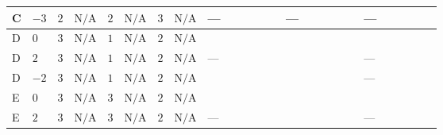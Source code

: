 \documentclass[8pt]{article}
\begin{document}
\begin{landscape}
\begin{longtable}{@{}llcccccc >{\raggedright\arraybackslash}p{0.21\linewidth} >{\raggedright\arraybackslash}p{0.21\linewidth} >{\raggedright\arraybackslash}p{0.21\linewidth}@{}}
\midrule
C & $-3$ & $2$ & $\text{N/A}$ & $2$ & $\text{N/A}$ & $3$ & $\text{N/A}$ & --- & --- & --- \\
\midrule
D & $0$ & $3$ & $\text{N/A}$ & $1$ & $\text{N/A}$ & $2$ & $\text{N/A}$ & \scriptsize\adjustbox{max width=\linewidth}{$\begin{gathered} +\frac{8}{3} {\lambda_{X_{14}}} \left({\lambda_{X_{14}}}\right)^{*}\end{gathered}$} & \scriptsize\adjustbox{max width=\linewidth}{$\begin{gathered} -\frac{33 {g_2}^2 {\lambda_{HS_1}^{(A)}}}{2}\end{gathered}$} & \scriptsize\adjustbox{max width=\linewidth}{$\begin{gathered} -\frac{3 {g_1}^2 {\lambda_{HS_1}^{(A)}}}{2}\end{gathered}$} \\
\midrule
D & $2$ & $3$ & $\text{N/A}$ & $1$ & $\text{N/A}$ & $2$ & $\text{N/A}$ & --- & \scriptsize\adjustbox{max width=\linewidth}{$\begin{gathered} -\frac{33 {g_2}^2 {\lambda_{HS_1}^{(A)}}}{2}\end{gathered}$} & --- \\
\midrule
D & $-2$ & $3$ & $\text{N/A}$ & $1$ & $\text{N/A}$ & $2$ & $\text{N/A}$ & \scriptsize\adjustbox{max width=\linewidth}{$\begin{gathered} -\frac{8}{3} {\lambda_{X_{12}}} \left({\lambda_{X_{12}}}\right)^{*}\end{gathered}$} & \scriptsize\adjustbox{max width=\linewidth}{$\begin{gathered} -\frac{33 {g_2}^2 {\lambda_{HS_1}^{(A)}}}{2}\end{gathered}$} & --- \\
\midrule
E & $0$ & $3$ & $\text{N/A}$ & $3$ & $\text{N/A}$ & $2$ & $\text{N/A}$ & \scriptsize\adjustbox{max width=\linewidth}{$\begin{gathered} -\frac{8}{9} {\lambda_{X_{14}}} \left({\lambda_{X_{14}}}\right)^{*}\end{gathered}$} & \scriptsize\adjustbox{max width=\linewidth}{$\begin{gathered} -\frac{33 {g_2}^2 {\lambda_{HS_1}^{(A)}}}{2}\end{gathered}$} & \scriptsize\adjustbox{max width=\linewidth}{$\begin{gathered} -\frac{3 {g_1}^2 {\lambda_{HS_1}^{(A)}}}{2}\end{gathered}$} \\
\midrule
E & $2$ & $3$ & $\text{N/A}$ & $3$ & $\text{N/A}$ & $2$ & $\text{N/A}$ & --- & \scriptsize\adjustbox{max width=\linewidth}{$\begin{gathered} -\frac{33 {g_2}^2 {\lambda_{HS_1}^{(A)}}}{2}\end{gathered}$} & --- \\

\end{longtable}
\end{landscape}
\end{document}
